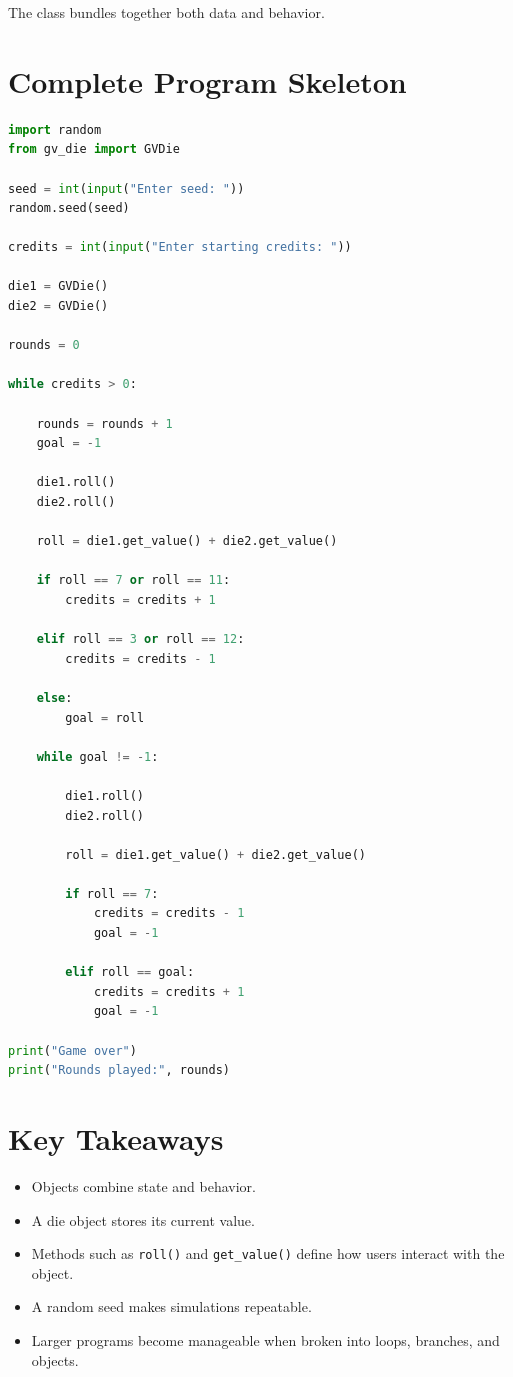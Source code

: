 \documentclass[11pt]{article}
\begin{document}
The class bundles together both data and behavior.

\section{Complete Program Skeleton}

\begin{lstlisting}[language=Python]
import random
from gv_die import GVDie

seed = int(input("Enter seed: "))
random.seed(seed)

credits = int(input("Enter starting credits: "))

die1 = GVDie()
die2 = GVDie()

rounds = 0

while credits > 0:

    rounds = rounds + 1
    goal = -1

    die1.roll()
    die2.roll()

    roll = die1.get_value() + die2.get_value()

    if roll == 7 or roll == 11:
        credits = credits + 1

    elif roll == 3 or roll == 12:
        credits = credits - 1

    else:
        goal = roll

    while goal != -1:

        die1.roll()
        die2.roll()

        roll = die1.get_value() + die2.get_value()

        if roll == 7:
            credits = credits - 1
            goal = -1

        elif roll == goal:
            credits = credits + 1
            goal = -1

print("Game over")
print("Rounds played:", rounds)
\end{lstlisting}

\section{Key Takeaways}

\begin{itemize}
    \item Objects combine state and behavior.
    \item A die object stores its current value.
    \item Methods such as \texttt{roll()} and \texttt{get\_value()} define how users interact with the object.
    \item A random seed makes simulations repeatable.
    \item Larger programs become manageable when broken into loops, branches, and objects.
\end{itemize}
\end{document}
